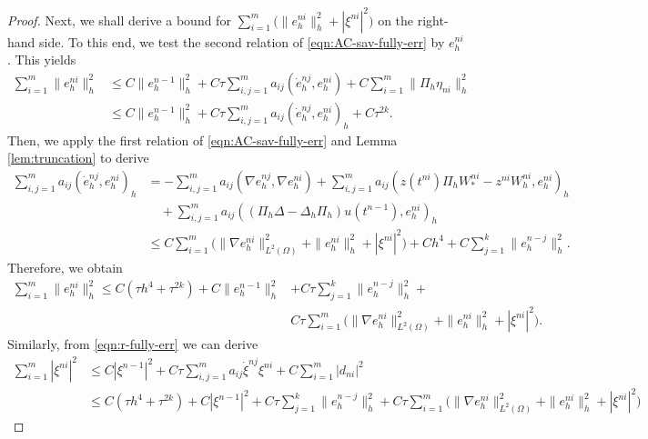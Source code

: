 \documentclass[a4paper, oneside]{book}
\def\II{(\Omega)}
\begin{document}
\begin{proof}
Next, we shall derive a bound for  $ \sum_{i=1}^m \Big(\|  e_h^{ni} \|_h^2+ |\xi^{ni}|^2 \Big)$
 on the right-hand side. To this
end, we test the second relation of \eqref{eqn:AC-sav-fully-err} by $e_h^{ni}$. This yields
\begin{equation*}
\begin{split}
 \sum_{i=1}^m \|e_h^{ni}\|_h^2 & \le C \|  e_h^{n-1} \|_h^2 + C\tau\sum_{i,j=1}^m a_{ij}(\dot e_h^{nj},e_h^{ni}) + C\sum_{i=1}^m \| \Pi_h \eta_{ni} \|_h^2\\
& \le  C \|  e_h^{n-1} \|_h^2 + C\tau\sum_{i,j=1}^m a_{ij}(\dot e_h^{nj},e_h^{ni}) _h + C\tau^{2k}.
\end{split}
\end{equation*}
Then, we apply the first relation of  \eqref{eqn:AC-sav-fully-err} and Lemma \ref{lem:truncation} to derive
\begin{equation*}
\begin{split}
 \sum_{i,j=1}^m a_{ij}(\dot e_h^{nj},e_h^{ni})_h &= - \sum_{i,j=1}^m a_{ij}(\nabla e_h^{nj}, \nabla e_h^{ni})
 + \sum_{i,j=1}^m a_{ij}   (z(t^{ni}) \Pi_h W_*^{ni} - z^{ni} W_h^{ni}, e_h^{ni})_h\\
&\quad + \sum_{i,j=1}^m a_{ij}  ((\Pi_h \Delta - \Delta_h \Pi_h) u(t^{n-1}),  e_h^{ni} )_h \\
&\le C\sum_{i=1}^m \Big(\| \nabla e_h^{ni}  \|_{L^2\II}^2 + \|  e_h^{ni}  \|_{h}^2 + |\xi^{ni}|^2 \Big)+ Ch^4 + C\sum_{j=1}^k \| e_h^{n-j} \|_h^2.
\end{split}
\end{equation*}
Therefore, we obtain
\begin{align*}
 \sum_{i=1}^m \|e_h^{ni}\|_h^2   \le  C( \tau h^4+\tau^{2k}) + C\|  e_h^{n-1} \|_h^2 &+ C\tau \sum_{j=1}^k \| e_h^{n-j} \|_h^2 + \\
  &C\tau \sum_{i=1}^m \Big(\| \nabla e_h^{ni}  \|_{L^2\II}^2 + \|  e_h^{ni}  \|_{h}^2 + |\xi^{ni}|^2 \Big).
\end{align*}
Similarly, from \eqref{eqn:r-fully-err} we can derive
\begin{equation*}
\begin{split}
 \sum_{i=1}^m |\xi^{ni}|^2 & \le C |\xi^{n-1}|^2 + C\tau\sum_{i,j=1}^m a_{ij} \dot \xi^{nj} \xi^{ni} + C\sum_{i=1}^m |d_{ni}|^2\\
&\le C(\tau h^4 + \tau^{2k})+C|\xi^{n-1}|^2  + C\tau \sum_{j=1}^k \| e_h^{n-j} \|_h^2 +
 C\tau \sum_{i=1}^m \Big(\| \nabla e_h^{ni}  \|_{L^2\II}^2 + \|  e_h^{ni}  \|_{h}^2 + |\xi^{ni}|^2 \Big)

\end{split}
\end{equation*}
\end{proof}
\end{document}

